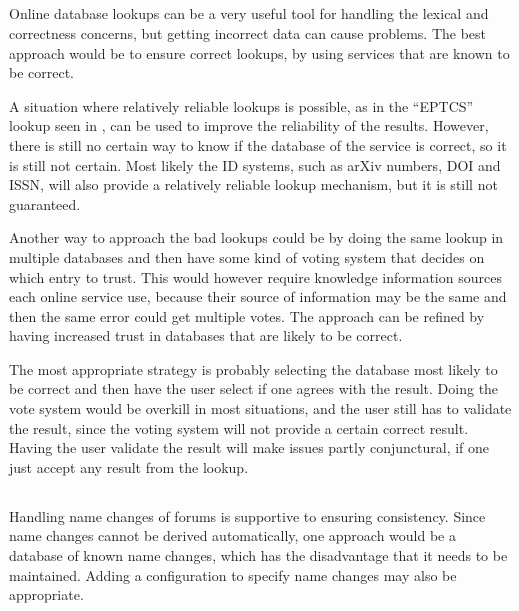 \subsection{}
\label{sec:approach_look_ups}

Online database lookups can be a very useful tool for handling the
lexical and correctness concerns, but getting incorrect data can cause
problems.  The best approach would be to ensure correct lookups, by
using services that are known to be correct.

A situation where relatively reliable lookups is possible, as in the
``EPTCS'' lookup seen in , can be used to
improve the reliability of the results.  However, there is still no
certain way to know if the database of the service is correct, so it
is still not certain.  Most likely the ID systems, such as arXiv
numbers, DOI and ISSN, will also provide a relatively reliable lookup
mechanism, but it is still not guaranteed.

Another way to approach the bad lookups could be by doing the same
lookup in multiple databases and then have some kind of voting system
that decides on which entry to trust.  This would however require
knowledge information sources each online service use, because their
source of information may be the same and then the same error could
get multiple votes.  The approach can be refined by having increased
trust in databases that are likely to be correct.

The most appropriate strategy is probably selecting the database most
likely to be correct and then have the user select if one agrees with
the result.  Doing the vote system would be overkill in most
situations, and the user still has to validate the result, since the
voting system will not provide a certain correct result.  Having the
user validate the result will make issues partly conjunctural, if one
just accept any result from the lookup.


\subsection{}

Handling name changes of forums is supportive to ensuring consistency.
Since name changes cannot be derived automatically, one approach would
be a database of known name changes, which has the disadvantage that
it needs to be maintained.  Adding a configuration to specify name
changes may also be appropriate.


